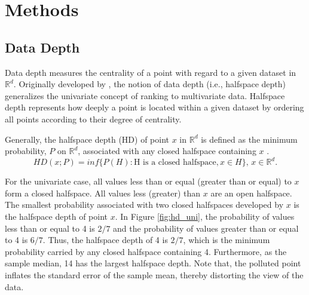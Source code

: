 \documentclass[a4paper,UKenglish]{lipics-v2018}
\begin{document}
%
%


\section{Methods}
\label{sec:methods}

\subsection{Data Depth}
Data depth measures the centrality of a point with regard to a given dataset in $\mathbb{R}^d$.  Originally developed by \cite{tukey75ICM}, the notion of data depth (i.e., halfspace depth) generalizes the univariate concept of ranking to multivariate data. Halfspace depth represents how deeply a point is located within a given dataset by ordering all points according to their degree of centrality. 

Generally, the halfspace depth (HD) of point $x$ in  $\mathbb{R}^d$ is defined as the minimum probability, $P$ on  $\mathbb{R}^d$, associated with any closed halfspace containing $x$ \cite{liu00AS}. 
\begin{equation*}\label{eq:hd}
HD(x;P) = inf\{P(H): \text{H is a closed halfspace}, x \in H\}\text{, } x \in \mathbb{R}^d.
\end{equation*}

For the univariate case, all values less than or equal (greater than or equal) to $x$ form a closed halfspace. All values less (greater) than $x$ are an open halfspace. The smallest probability associated with two closed halfspaces developed by $x$ is the halfspace depth of  point $x$.
In Figure \ref{fig:hd_uni}, the probability of values less than or equal to 4 is  $2/7$ and the probability of values greater than or equal to 4 is $6/7$. Thus, the halfspace depth of 4 is $2/7$, which is the minimum probability carried by any closed halfspace containing 4. Furthermore, as the sample median, 14 has the largest halfspace depth. Note that, the polluted point inflates the standard error of the sample mean, thereby distorting the view of the data. 
\end{document}
